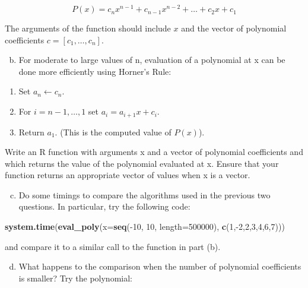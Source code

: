 \documentclass[]{article}
\newenvironment{Shaded}{}{}
\newcommand{\KeywordTok}[1]{\textcolor[rgb]{0.00,0.44,0.13}{\textbf{{#1}}}}
\newcommand{\DataTypeTok}[1]{\textcolor[rgb]{0.56,0.13,0.00}{{#1}}}
\newcommand{\DecValTok}[1]{\textcolor[rgb]{0.25,0.63,0.44}{{#1}}}
\newcommand{\NormalTok}[1]{{#1}}
\begin{document}
\[P(x) = c_n x^{n−1} + c_{n−1} x^{n−2} + \ldots + c_2 x + c_1\]

The arguments of the function should include $x$ and the vector of
polynomial coefficients $c = [c_1, \ldots, c_n]$.

\begin{enumerate}[a.]
\setcounter{enumi}{1}
\item
  For moderate to large values of n, evaluation of a polynomial at x can
  be done more efficiently using Horner's Rule:
\end{enumerate}

\begin{enumerate}[1.]
\item
  Set $a_n \leftarrow c_n$.
\item
  For $i=n−1,\ldots,1$ set $a_i = a_{i+1} x+c_i$.
\item
  Return $a_1$. (This is the computed value of $P(x)$).
\end{enumerate}

Write an R function with arguments x and a vector of polynomial
coefficients and which returns the value of the polynomial evaluated at
x. Ensure that your function returns an appropriate vector of values
when x is a vector.

\begin{enumerate}[a.]
\setcounter{enumi}{2}
\item
  Do some timings to compare the algorithms used in the previous two
  questions. In particular, try the following code:
\end{enumerate}

\begin{Shaded}
\begin{Highlighting}[]
\KeywordTok{system.time}\NormalTok{(}\KeywordTok{eval_poly}\NormalTok{(}\DataTypeTok{x=}\KeywordTok{seq}\NormalTok{(-}\DecValTok{10}\NormalTok{, }\DecValTok{10}\NormalTok{, }\DataTypeTok{length=}\DecValTok{500000}\NormalTok{), }\KeywordTok{c}\NormalTok{(}\DecValTok{1}\NormalTok{,-}\DecValTok{2}\NormalTok{,}\DecValTok{2}\NormalTok{,}\DecValTok{3}\NormalTok{,}\DecValTok{4}\NormalTok{,}\DecValTok{6}\NormalTok{,}\DecValTok{7}\NormalTok{)))}
\end{Highlighting}
\end{Shaded}

and compare it to a similar call to the function in part (b).

\begin{enumerate}[a.]
\setcounter{enumi}{3}
\item
  What happens to the comparison when the number of polynomial
  coefficients is smaller? Try the polynomial:
\end{enumerate}
\end{document}
